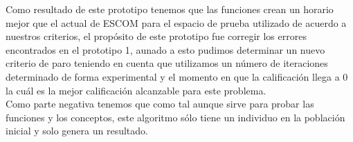 Como resultado de este prototipo tenemos que las funciones crean un horario mejor que el actual de ESCOM para el espacio de prueba utilizado de acuerdo a nuestros criterios, el propósito de este prototipo fue corregir los errores encontrados en el prototipo 1, aunado a esto pudimos determinar un nuevo criterio de paro teniendo en cuenta que utilizamos un número de iteraciones determinado de forma experimental y el momento en que la calificación llega a 0 la cuál es la mejor calificación alcanzable para este problema.\\

Como parte negativa tenemos que como tal aunque sirve para probar las funciones y los conceptos, este algoritmo sólo tiene un individuo en la población inicial y solo genera un resultado.\\